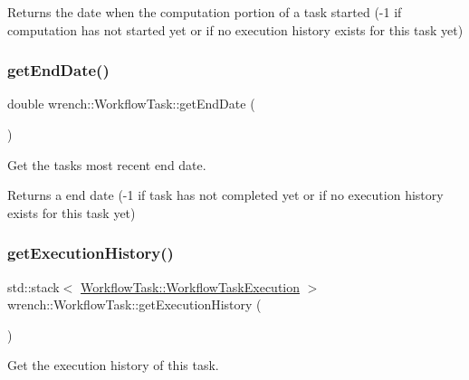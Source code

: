 \begin{DoxyReturn}{Returns}
the date when the computation portion of a task started (-\/1 if computation has not started yet or if no execution history exists for this task yet) 
\end{DoxyReturn}
\mbox{\label{classwrench_1_1_workflow_task_a2c413ff97c665416c2c68898ef986df0}} 
\subsubsection{\texorpdfstring{get\+End\+Date()}{getEndDate()}}
{\footnotesize\ttfamily double wrench\+::\+Workflow\+Task\+::get\+End\+Date (\begin{DoxyParamCaption}{ }\end{DoxyParamCaption})}



Get the task\textquotesingle{}s most recent end date. 

\begin{DoxyReturn}{Returns}
a end date (-\/1 if task has not completed yet or if no execution history exists for this task yet) 
\end{DoxyReturn}
\mbox{\label{classwrench_1_1_workflow_task_a69dc57568ee24ef1d2824e9f6d919d48}} 
\subsubsection{\texorpdfstring{get\+Execution\+History()}{getExecutionHistory()}}
{\footnotesize\ttfamily std\+::stack$<$ \hyperlink{structwrench_1_1_workflow_task_1_1_workflow_task_execution}{Workflow\+Task\+::\+Workflow\+Task\+Execution} $>$ wrench\+::\+Workflow\+Task\+::get\+Execution\+History (\begin{DoxyParamCaption}{ }\end{DoxyParamCaption})}



Get the execution history of this task. 

